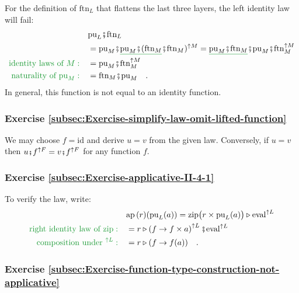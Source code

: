 For the definition of $\text{ftn}_{L}$ that flattens the last three
layers, the left identity law will fail:
\begin{align*}
 & \text{pu}_{L}\bef\text{ftn}_{L}\\
 & =\text{pu}_{M}\bef\gunderline{\text{pu}_{M}\bef(\text{ftn}_{M}}\bef\text{ftn}_{M})^{\uparrow M}=\gunderline{\text{pu}_{M}\bef\text{ftn}_{M}}\bef\text{pu}_{M}\bef\text{ftn}_{M}^{\uparrow M}\\
{\color{greenunder}\text{identity laws of }M:}\quad & =\text{pu}_{M}\bef\text{ftn}_{M}^{\uparrow M}\\
{\color{greenunder}\text{naturality of }\text{pu}_{M}:}\quad & =\text{ftn}_{M}\bef\text{pu}_{M}\quad.
\end{align*}
In general, this function is not equal to an identity function.


\subsubsection*{Exercise \ref{subsec:Exercise-simplify-law-omit-lifted-function}}

We may choose $f=\text{id}$ and derive $u=v$ from the given law.
Conversely, if $u=v$ then $u\bef f^{\uparrow F}=v\bef f^{\uparrow F}$
for any function $f$.

\subsubsection*{Exercise \ref{subsec:Exercise-applicative-II-4-1}}

To verify the law, write:
\begin{align*}
 & \text{ap}\,(r)(\text{pu}_{L}(a))=\text{zip}\big(r\times\text{pu}_{L}(a)\big)\triangleright\text{eval}^{\uparrow L}\\
{\color{greenunder}\text{right identity law of }\text{zip}:}\quad & =r\triangleright\left(f\rightarrow f\times a\right)^{\uparrow L}\bef\text{eval}^{\uparrow L}\\
{\color{greenunder}\text{composition under }^{\uparrow L}:}\quad & =r\triangleright(f\rightarrow f(a))\quad.
\end{align*}


\subsubsection*{Exercise \ref{subsec:Exercise-function-type-construction-not-applicative}}

